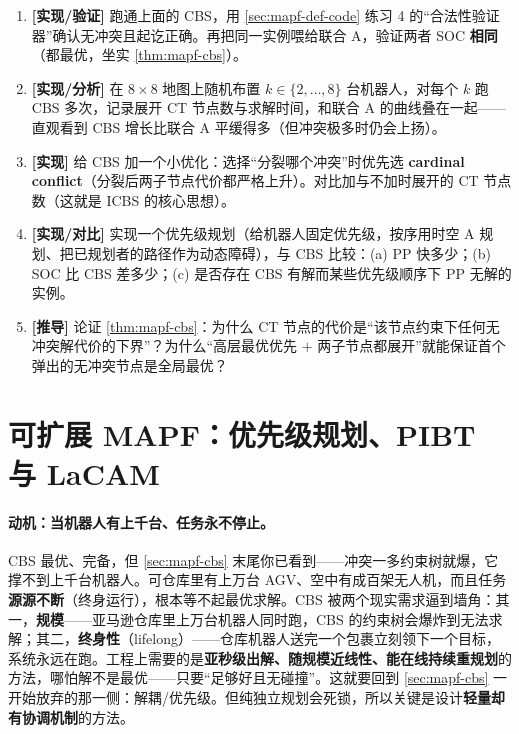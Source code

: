 \begin{exercise}
\begin{enumerate}
  \item \textbf{[实现/验证]} 跑通上面的 CBS，用 \cref{sec:mapf-def-code} 练习 4 的“合法性验证器”确认无冲突且起讫正确。再把同一实例喂给联合 A\*，验证两者 SOC \textbf{相同}（都最优，坐实 \cref{thm:mapf-cbs}）。
  \item \textbf{[实现/分析]} 在 $8\times8$ 地图上随机布置 $k\in\{2,\dots,8\}$ 台机器人，对每个 $k$ 跑 CBS 多次，记录展开 CT 节点数与求解时间，和联合 A\* 的曲线叠在一起——直观看到 CBS 增长比联合 A\* 平缓得多（但冲突极多时仍会上扬）。
  \item \textbf{[实现]} 给 CBS 加一个小优化：选择“分裂哪个冲突”时优先选 \textbf{cardinal conflict}（分裂后两子节点代价都严格上升）。对比加与不加时展开的 CT 节点数（这就是 ICBS 的核心思想）。
  \item \textbf{[实现/对比]} 实现一个优先级规划（给机器人固定优先级，按序用时空 A\* 规划、把已规划者的路径作为动态障碍），与 CBS 比较：(a) PP 快多少；(b) SOC 比 CBS 差多少；(c) 是否存在 CBS 有解而某些优先级顺序下 PP 无解的实例。
  \item \textbf{[推导]} 论证 \cref{thm:mapf-cbs}：为什么 CT 节点的代价是“该节点约束下任何无冲突解代价的下界”？为什么“高层最优优先 $+$ 两子节点都展开”就能保证首个弹出的无冲突节点是全局最优？
\end{enumerate}
\end{exercise}

\section{可扩展 MAPF：优先级规划、PIBT 与 LaCAM}
\label{sec:mapf-scalable}

\paragraph{动机：当机器人有上千台、任务永不停止。}
CBS 最优、完备，但 \cref{sec:mapf-cbs} 末尾你已看到——冲突一多约束树就爆，它撑不到上千台机器人。可仓库里有上万台 AGV、空中有成百架无人机，而且任务\textbf{源源不断}（终身运行），根本等不起最优求解。CBS 被两个现实需求逼到墙角：其一，\textbf{规模}——亚马逊仓库里上万台机器人同时跑，CBS 的约束树会爆炸到无法求解；其二，\textbf{终身性}（lifelong）——仓库机器人送完一个包裹立刻领下一个目标，系统永远在跑。工程上需要的是\textbf{亚秒级出解、随规模近线性、能在线持续重规划}的方法，哪怕解不是最优——只要“足够好且无碰撞”。这就要回到 \cref{sec:mapf-cbs} 一开始放弃的那一侧：解耦/优先级。但纯独立规划会死锁，所以关键是设计\textbf{轻量却有协调机制}的方法。

